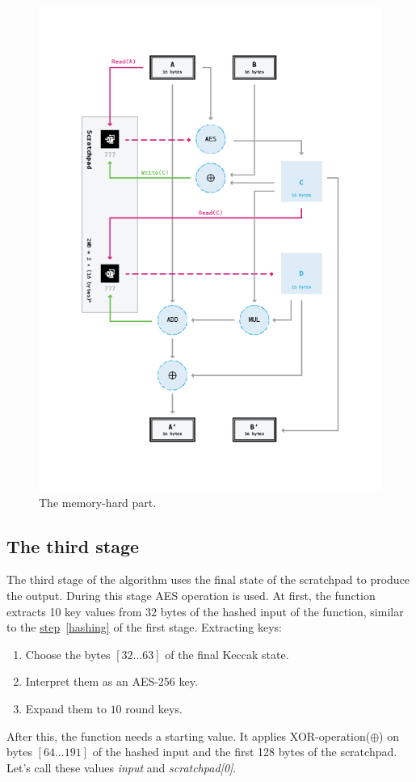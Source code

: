 \begin{figure}[H]
  \centering
  \includegraphics[scale=0.65,keepaspectratio]{Images/Bill/stage_2.png}
  \caption{The memory-hard part.~\cite{bill}}
  \label{fig:stage2}
\end{figure}

\subsection{The third stage}
The third stage of the algorithm uses the final state of the scratchpad to produce the output. During this stage AES operation is used. At first, the function extracts 10 key values from 32 bytes of the hashed input of the function, similar to the \hyperref[hashing]{step}~\ref{hashing} of the first stage. Extracting keys:
\begin{enumerate}
  \item Choose the bytes $[32...63]$ of the final Keccak state.
  \item Interpret them as an AES-256 key.
  \item \label{keys} Expand them to $10$ round keys.
\end{enumerate}
After this, the function needs a starting value. It applies XOR-operation($\oplus$) on bytes $[64...191]$ of the hashed input and the first 128 bytes of the scratchpad. Let's call these values \emph{input} and \emph{scratchpad[0]}.

